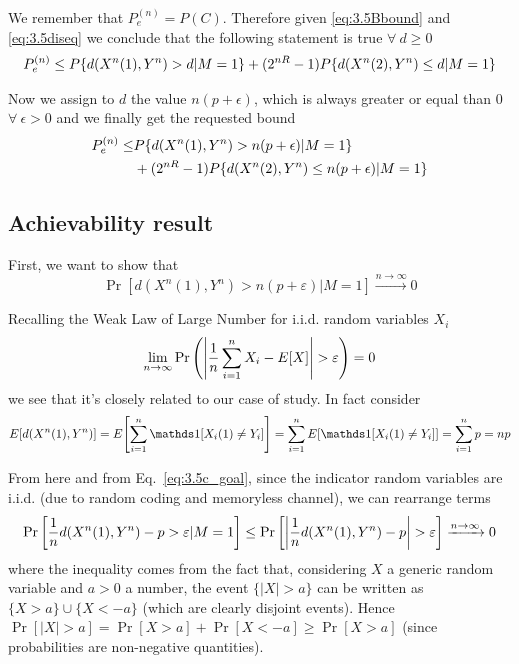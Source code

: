 We remember that $P_e^{(n)}=P(C)$. Therefore given \eqref{eq:3.5Bbound} and \eqref{eq:3.5diseq} we conclude that the following statement is true $\forall \  d \geq 0$
%
\begin{equation}
	\begin{gathered}
		P_e^{(n)} \leq
		P \{ d(X^n(1),Y^n)>d | M = 1 \} + (2^{nR}-1) P \{ d(X^n(2),Y^n) \leq d | M = 1 \}
	\end{gathered}
\end{equation}

Now we assign to $d$ the value $n(p+\epsilon)$, which is always greater or equal than $0$ $\forall \  \epsilon > 0$ and we finally get the requested bound
%
\begin{align}
\begin{split}
P_e^{(n)} \leq&
P \{ d(X^n(1),Y^n)> n(p+\epsilon) | M = 1 \} \\
&+ (2^{nR}-1) P \{ d(X^n(2),Y^n) \leq n(p+\epsilon) | M = 1 \}
\end{split}
\end{align}

\subsection{Achievability result}

First, we want to show that
%
\begin{equation}\label{eq:3.5c_goal}
\Pr[d(X^n(1),Y^n)>n(p+\varepsilon) | M=1] \xrightarrow{n\rightarrow \infty} 0
\end{equation}

Recalling the Weak Law of Large Number for i.i.d. random variables $X_i$
%
\begin{equation}
\lim_{n \rightarrow \infty} \Pr \qty( \qty|\frac{1}{n} \sum_{i=1}^{n} X_i - E[X]|> \varepsilon ) = 0
\end{equation}
%
we see that it's closely related to our case of study. In fact consider
%
\begin{equation}
E[d(X^n(1),Y^n)] = E\qty[ \sum_{i=1}^{n} \indicator[X_i(1) \neq Y_i] ] = \sum_{i=1}^n E[ \indicator[X_i(1) \neq Y_i] ] = \sum_{i=1}^n p = np
\end{equation}

From here and from Eq.~\eqref{eq:3.5c_goal}, since the indicator random variables are i.i.d. (due to random coding and memoryless channel), we can rearrange terms
%
\begin{equation}
\Pr \qty[ \frac{1}{n} d(X^n(1),Y^n) - p > \varepsilon |M=1] \leq \Pr \qty[ \qty| \frac{1}{n} d(X^n(1),Y^n) - p| > \varepsilon] \xrightarrow{n\rightarrow \infty} 0
\end{equation}
%
where the inequality comes from the fact that, considering $X$ a generic random variable and $a>0$ a number, the event $\{|X|>a\}$ can be written as $\{X>a\} \cup \{X<-a\}$ (which are clearly disjoint events). Hence $\Pr[|X|>a] = \Pr[X>a] + \Pr[X<-a] \geq \Pr[X>a]$ (since probabilities are non-negative quantities).

